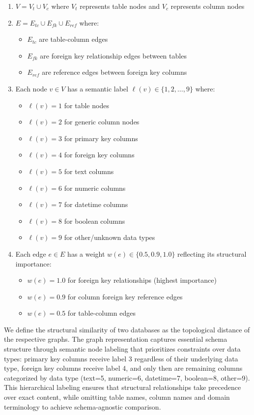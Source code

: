 \begin{enumerate}
    \item $V = V_t \cup V_c$ where $V_t$ represents table nodes and $V_c$ represents column nodes
    \item $E = E_{tc} \cup E_{fk} \cup E_{ref}$ where:
        \begin{itemize}
            \item $E_{tc}$ are table-column edges
            \item $E_{fk}$ are foreign key relationship edges between tables
            \item $E_{ref}$ are reference edges between foreign key columns
        \end{itemize}
    \item Each node $v \in V$ has a semantic label $\ell(v) \in \{1, 2, \ldots, 9\}$ where:
        \begin{itemize}
            \item $\ell(v) = 1$ for table nodes
            \item $\ell(v) = 2$ for generic column nodes
            \item $\ell(v) = 3$ for primary key columns
            \item $\ell(v) = 4$ for foreign key columns
            \item $\ell(v) = 5$ for text columns
            \item $\ell(v) = 6$ for numeric columns
            \item $\ell(v) = 7$ for datetime columns
            \item $\ell(v) = 8$ for boolean columns
            \item $\ell(v) = 9$ for other/unknown data types
        \end{itemize}
    \item Each edge $e \in E$ has a weight $w(e) \in \{0.5, 0.9, 1.0\}$ reflecting its structural importance:
        \begin{itemize}
            \item $w(e) = 1.0$ for foreign key relationships (highest importance)
            \item $w(e) = 0.9$ for column foreign key reference edges
            \item $w(e) = 0.5$ for table-column edges
        \end{itemize}
\end{enumerate}

We define the structural similarity of two databases as the topological distance
of the respective graphs. The graph representation captures essential schema
structure through semantic node labeling that prioritizes constraints over data
types: primary key columns receive label 3 regardless of their underlying data
type, foreign key columns receive label 4, and only then are remaining columns
categorized by data type (text=5, numeric=6, datetime=7, boolean=8, other=9).
This hierarchical labeling ensures that structural relationships take
precedence over exact content, while omitting table names, column names and
domain terminology to achieve schema-agnostic comparison.

